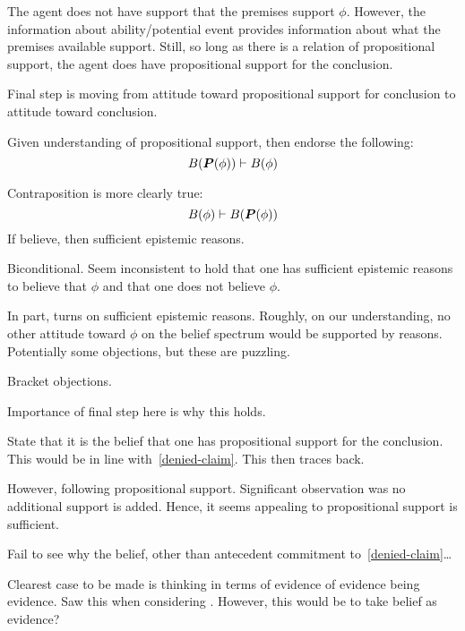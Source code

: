 {
  \color{red}
  \begin{note}
    The agent does not have support that the premises support \(\phi\).
    However, the information about ability/potential event provides information about what the premises available support.
    Still, so long as there is a relation of propositional support, the agent does have propositional support for the conclusion.
  \end{note}
}

\begin{note}
  Final step is moving from attitude toward propositional support for conclusion to attitude toward conclusion.

  Given understanding of propositional support, then endorse the following:
  \[B(\bm{P}(\phi)) \vdash B(\phi)\]

  Contraposition is more clearly true:
  \[B(\phi) \vdash B(\bm{P}(\phi))\]
  If believe, then sufficient epistemic reasons.

  Biconditional.
  Seem inconsistent to hold that one has sufficient epistemic reasons to believe that \(\phi\) and that one does not believe \(\phi\).

  In part, turns on sufficient epistemic reasons.
  Roughly, on our understanding, no other attitude toward \(\phi\) on the belief spectrum would be supported by reasons.
  Potentially some objections, but these are puzzling.

  Bracket objections.

  Importance of final step here is why this holds.

  State that it is the belief that one has propositional support for the conclusion.
  This would be in line with~\ref{denied-claim}.
  This then traces back.

  However, following propositional support.
  Significant observation was no additional support is added.
  Hence, it seems appealing to propositional support is sufficient.

  Fail to see why the belief, other than antecedent commitment to~\ref{denied-claim}\dots
\end{note}

\begin{note}[EEE]
  Clearest case to be made is thinking in terms of evidence of evidence being evidence.
  Saw this when considering \AR{}.
  However, this would be to take belief as evidence?
\end{note}

